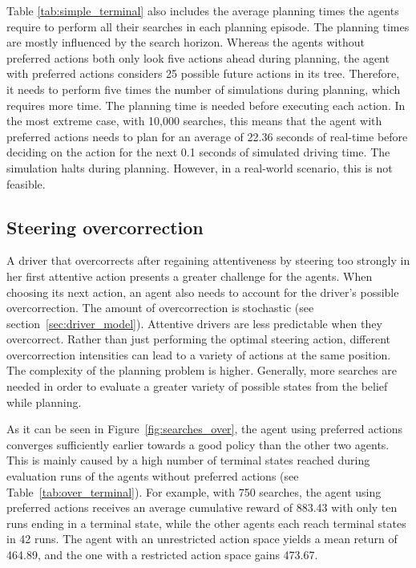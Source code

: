 

Table \ref{tab:simple_terminal} also includes the average planning times the agents require to perform all their searches in each planning episode. The planning times are mostly influenced by the search horizon. Whereas the agents without preferred actions both only look five actions ahead during planning, the agent with preferred actions considers 25 possible future actions in its tree. Therefore, it needs to perform five times the number of simulations during planning, which requires more time. The planning time is needed before executing each action. In the most extreme case, with 10,000 searches, this means that the agent with preferred actions needs to plan for an average of 22.36 seconds of real-time before deciding on the action for the next 0.1 seconds of simulated driving time. The simulation halts during planning. However, in a real-world scenario, this is not feasible.

\subsection{Steering overcorrection}

A driver that overcorrects after regaining attentiveness by steering too strongly in her first attentive action presents a greater challenge for the agents. When choosing its next action, an agent also needs to account for the driver's possible overcorrection. The amount of overcorrection is stochastic (see section~\ref{sec:driver_model}). Attentive drivers are less predictable when they overcorrect. Rather than just performing the optimal steering action, different overcorrection intensities can lead to a variety of actions at the same position. The complexity of the planning problem is higher. Generally, more searches are needed in order to evaluate a greater variety of possible states from the belief while planning.



As it can be seen in Figure~\ref{fig:searches_over}, the agent using preferred actions converges sufficiently earlier towards a good policy than the other two agents. This is mainly caused by a high number of terminal states reached during evaluation runs of the agents without preferred actions (see Table~\ref{tab:over_terminal}). For example, with 750 searches, the agent using preferred actions receives an average cumulative reward of 883.43 with only ten runs ending in a terminal state, while the other agents each reach terminal states in 42 runs. The agent with an unrestricted action space yields a mean return of 464.89, and the one with a restricted action space gains 473.67. 

